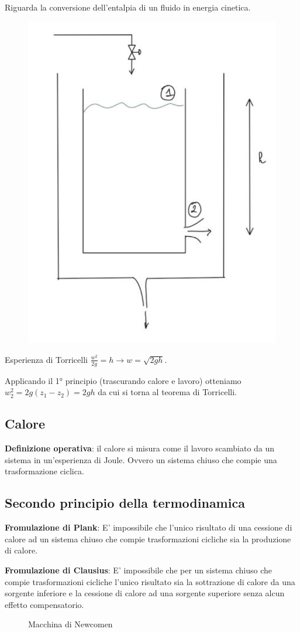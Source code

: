 \documentclass[a4paper]{article}
\numberwithin{equation}{section}%
\begin{document}
Riguarda la conversione dell'entalpia di un fluido in energia cinetica.

\begin{figure}[H]
	\begin{center}
		\includegraphics[width=0.3\columnwidth]{tuboefflusso.png}
	\end{center}
\end{figure}

Esperienza di Torricelli $\frac{w^{2}}{2 g}=h \rightarrow w=\sqrt{2 g h}$. 

Applicando il 1° principio (trascurando calore e lavoro) otteniamo $w_{2}^{2}=2 g\left(z_{1}-z_{2}\right)=2 g h$ da cui si torna al teorema di Torricelli.

\subsection{Calore}
\textbf{Definizione operativa}: il calore si misura come il lavoro scambiato da un sistema in un'esperienza di Joule. Ovvero un sistema chiuso che compie una trasformazione ciclica. 

\subsection{Secondo principio della termodinamica}
\textbf{Fromulazione di Plank}:
E' impossibile che l'unico risultato di una cessione di calore ad un sistema chiuso che compie trasformazioni cicliche sia la produzione di calore.

\textbf{Fromulazione di Clausius}:
E' impossibile che per un sistema chiuso che compie trasformazioni cicliche l'unico risultato sia la sottrazione di calore da una sorgente inferiore e la cessione di calore ad una sorgente superiore senza alcun effetto compensatorio.

\begin{figure}[H]
	\begin{center}
		\caption{Macchina di Newcomen}
				 
	\end{center}
\end{figure}
\end{document}
